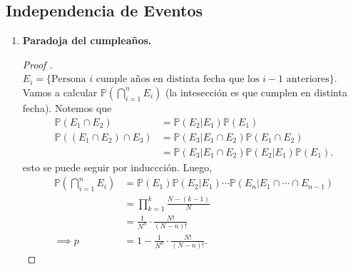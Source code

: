 \subsection{Independencia de Eventos}

\begin{enumerate}
	\item \textbf{Paradoja del cumpleaños.}
	\begin{proof}[Proof ]
		$E_i = \{ \text{Persona } i \text{ cumple años en distinta fecha que los } i-1 \text{ anteriores} \} $. Vamos a calcular $\mathbb{P}\left( \bigcap_{i=1}^{n} E_i \right)$ (la intesección es que cumplen en distinta fecha). Notemos que
		\begin{align*}
			\mathbb{P}(E_1\cap E_2) & = \mathbb{P}(E_2|E_1)\mathbb{P}(E_1) \\
			\mathbb{P}((E_1\cap E_2)\cap E_3) & = \mathbb{P}(E_3|E_1\cap E_2) \mathbb{P}(E_1\cap E_2) \\
			& = \mathbb{P}(E_3|E_1\cap E_2) \mathbb{P}(E_2|E_1) \mathbb{P}(E_1)
		.\end{align*}
		esto se puede seguir por induccción. Luego,
		\begin{align*}
			\mathbb{P}\left(\bigcap_{i=1}^{n} E_i \right) & = \mathbb{P}(E_1)\mathbb{P}(E_2|E_1)\cdots \mathbb{P}(E_n|E_1 \cap \cdots \cap E_{n-1}) \\
			& = \prod_{k=1}^{k} \frac{N-(k-1)}{N} \\
			& = \frac{1}{N^n}\cdot \frac{N!}{(N-n)!} \\
			\implies p & = 1- \frac{1}{N^n}\cdot \frac{N!}{(N-n)!}
		.\end{align*}
	\end{proof}


\end{enumerate}

